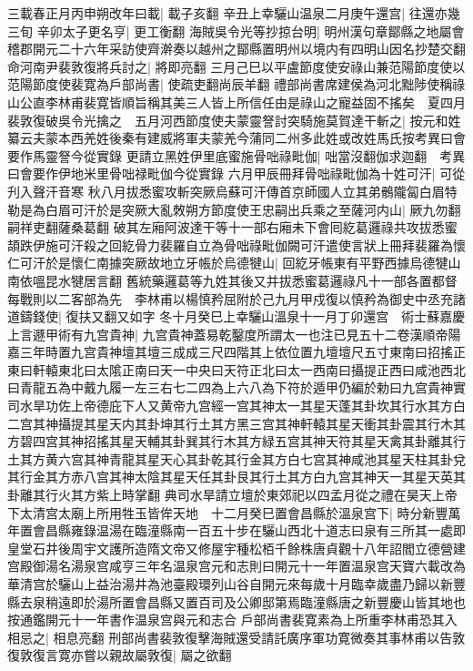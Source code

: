 三載春正月丙申朔改年曰載|{
	載子亥翻}
辛丑上幸驪山温泉二月庚午還宫|{
	往還亦幾三旬}
辛卯太子更名亨|{
	更工衡翻}
海賊吳令光等抄掠台明|{
	明州漢句章鄮縣之地屬會稽郡開元二十六年采訪使齊澣奏以越州之鄮縣置明州以境内有四明山因名抄楚交翻}
命河南尹裴敦復將兵討之|{
	將即亮翻}
三月己巳以平盧節度使安祿山兼范陽節度使以范陽節度使裴寛為戶部尚書|{
	使疏吏翻尚辰羊翻}
禮部尚書席建侯為河北黜陟使稱祿山公直李林甫裴寛皆順旨稱其美三人皆上所信任由是祿山之寵益固不搖矣　夏四月裴敦復破吳令光擒之　五月河西節度使夫蒙靈詧討突騎施莫賀達干斬之|{
	按元和姓纂云夫蒙本西羌姓後秦有建威將軍夫蒙羌今蒲同二州多此姓或改姓馬氏按考異曰會要作馬靈詧今從實錄}
更請立黑姓伊里底蜜施骨咄祿毗伽|{
	咄當沒翻伽求迦翻　考異曰會要作伊地米里骨咄禄毗伽今從實錄}
六月甲辰冊拜骨咄祿毗伽為十姓可汗|{
	可從刋入聲汗音寒}
秋八月拔悉蜜攻斬突厥烏蘇可汗傳首京師國人立其弟鶻隴匐白眉特勒是為白眉可汗於是突厥大亂敇朔方節度使王忠嗣出兵乘之至薩河内山|{
	厥九勿翻嗣祥吏翻薩桑葛翻}
破其左廂阿波達干等十一部右廂未下會囘紇葛邏祿共攻拔悉蜜頡跌伊施可汗殺之回紇骨力裴羅自立為骨咄祿毗伽闕可汗遣使言狀上冊拜裴羅為懷仁可汗於是懷仁南據突厥故地立牙帳於烏德犍山|{
	回紇牙帳東有平野西據烏德犍山南依嗢昆水犍居言翻}
舊統藥邏葛等九姓其後又并拔悉蜜葛邏祿凡十一部各置都督每戰則以二客部為先　李林甫以楊慎矜屈附於己九月甲戍復以慎矜為御史中丞充諸道鑄錢使|{
	復扶又翻又如字}
冬十月癸巳上幸驪山溫泉十一月丁卯還宫　術士蘇嘉慶上言遯甲術有九宫貴神|{
	九宫貴神蓋易乾鑿度所謂太一也注已見五十二卷漢順帝陽嘉三年時置九宫貴神壇其壇三成成三尺四階其上依位置九壇壇尺五寸東南曰招搖正東曰軒轅東北曰太隂正南曰天一中央曰天符正北曰太一西南曰攝提正西曰咸池西北曰青龍五為中戴九履一左三右七二四為上六八為下符於遁甲仍編於勅曰九宫貴神實司水旱功佐上帝德庇下人又黄帝九宫經一宫其神太一其星天蓬其卦坎其行水其方白二宫其神攝提其星天内其卦坤其行土其方黑三宫其神軒轅其星天衝其卦震其行木其方碧四宫其神招搖其星天輔其卦巽其行木其方緑五宫其神天符其星天禽其卦離其行土其方黄六宫其神青龍其星天心其卦乾其行金其方白七宫其神咸池其星天柱其卦兌其行金其方赤八宫其神太陰其星天任其卦艮其行土其方白九宫其神天一其星天英其卦離其行火其方紫上時掌翻}
典司水旱請立壇於東郊祀以四孟月從之禮在昊天上帝下太清宫太廟上所用牲玉皆侔天地　十二月癸巳置會昌縣於溫泉宫下|{
	時分新豐萬年置會昌縣雍錄温湯在臨潼縣南一百五十步在驪山西北十道志曰泉有三所其一處即皇堂石井後周宇文護所造隋文帝又修屋宇種松栢千餘株唐貞觀十八年詔閻立德營建宫殿御湯名湯泉宫咸亨三年名温泉宫元和志則曰開元十一年置温泉宫天寶六載改為華清宫於驪山上益治湯井為池臺殿環列山谷自開元來每歲十月臨幸歲盡乃歸以新豐縣去泉稍遠即於湯所置會昌縣又置百司及公卿邸第焉臨潼縣唐之新豐慶山皆其地也按通鑑開元十一年書作温泉宫與元和志合}
戶部尚書裴寛素為上所重李林甫恐其入相忌之|{
	相息亮翻}
刑部尚書裴敦復擊海賊還受請託廣序軍功寛微奏其事林甫以告敦復敦復言寛亦嘗以親故屬敦復|{
	屬之欲翻}
